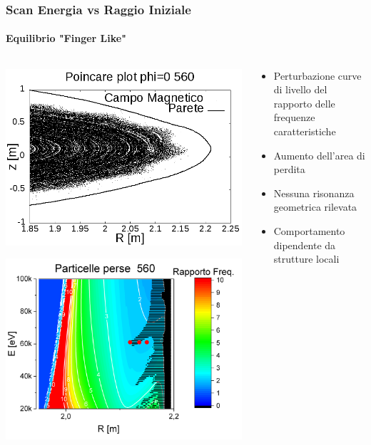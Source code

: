 \begin{frame}
\frametitle{Scan Energia vs Raggio Iniziale}
\framesubtitle{Equilibrio "Finger Like"}
\begin{columns}
	\begin{column}{0.4\textwidth}
		\begin{center}
		\includegraphics[scale=0.18]{Immagini/Simulazioni/Poincare/poincare_560.png}
		\end{center}
		\begin{center}
		\includegraphics[scale=0.20]{Immagini/Simulazioni/Risonanze/lost_particles.png}
		\end{center}
	\end{column}
	\begin{column}{0.4\textwidth}
		\begin{itemize}
			\item Perturbazione curve di livello del rapporto delle frequenze caratteristiche
			\item Aumento dell'area di perdita
			\item Nessuna risonanza geometrica rilevata
			\item Comportamento dipendente da strutture locali
		\end{itemize}
	\end{column}
\end{columns}
\end{frame}